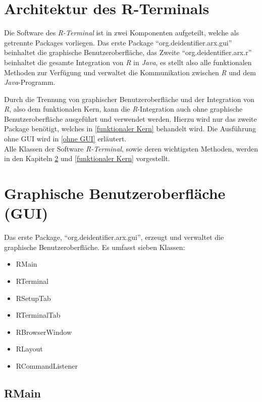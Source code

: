 \documentclass[a4paper, 12pt]{report} %
\begin{document}
\section{Architektur des R-Terminals}

Die Software des \textit{R-Terminal} ist in zwei Komponenten aufgeteilt, welche als getrennte Packages vorliegen. Das erste Package "`org.deidentifier.arx.gui"' beinhaltet die graphische Benutzeroberfläche, das Zweite "`org.deidentifier.arx.r"' beinhaltet die gesamte Integration von \textit{R} in \textit{Java}, es stellt also alle funktionalen Methoden zur Verfügung und verwaltet die Kommunikation zwischen \textit{R} und dem \textit{Java}-Programm.

Durch die Trennung von graphischer Benutzeroberfläche und der Integration von \textit{R}, also dem funktionalen Kern, kann die \textit{R}-Integration auch ohne graphische Benutzeroberfläche ausgeführt und verwendet werden. Hierzu wird nur das zweite Package benötigt, welches in \ref{funktionaler Kern} behandelt wird. Die Ausführung ohne GUI wird in \ref{ohne GUI} erläutert.\\

Alle Klassen der Software \textit{R-Terminal}, sowie deren wichtigsten Methoden, werden in den Kapiteln \ref{gui} und \ref{funktionaler Kern} vorgestellt.

\section{Graphische Benutzeroberfläche (GUI)}\label{gui}

\begin{samepage}

Das erste Package, "`org.deidentifier.arx.gui"', erzeugt und verwaltet die graphische Benutzeroberfläche. Es umfasst sieben Klassen:
\begin{itemize}
	\item RMain
	\item RTerminal
	\item RSetupTab
	\item RTerminalTab
	\item RBrowserWindow
	\item RLayout
	\item RCommandListener
\end{itemize}
\end{samepage}

\subsection{RMain}
\end{document}
